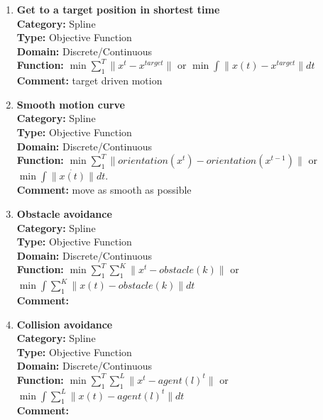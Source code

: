 \documentclass[12pt]{article}
\begin{document}
\begin{enumerate}
\item \textbf{Get to a target position in shortest time} \\
\label{obj:pos_reach}
\textbf{Category:} Spline \\
\textbf{Type:} Objective Function \\
\textbf{Domain:} Discrete/Continuous \\
\textbf{Function:} $ \min \sum_{1}^{T} \parallel x^{t} - x^{target} \parallel $ or $ \min \int \parallel x(t) - x^{target} \parallel dt  $ \\
\textbf{Comment:} target driven motion \\

\item \textbf{Smooth motion curve} \\
\label{obj:min_curve}
\textbf{Category:} Spline \\
\textbf{Type:} Objective Function \\
\textbf{Domain:} Discrete/Continuous \\
\textbf{Function:} $ \min \sum_{1}^{T} \parallel orientation(x^{t}) - orientation(x^{t-1}) \parallel $ or $ \min \int \parallel \dot{x(t)} \parallel dt $.\\
\textbf{Comment:} move as smooth as possible \\

\item \textbf{Obstacle avoidance} \\
\label{obj:obs_avd}
\textbf{Category:} Spline \\
\textbf{Type:} Objective Function \\
\textbf{Domain:} Discrete/Continuous \\
\textbf{Function:} $ \min \sum_{1}^{T} \sum_{1}^{K} \parallel x^{t} - obstacle(k) \parallel $ or $ \min \int \sum_{1}^{K} \parallel x(t) - obstacle(k) \parallel dt $ \\
\textbf{Comment:} \\

\item \textbf{Collision avoidance} \\
\label{obj:col_avd}
\textbf{Category:} Spline \\
\textbf{Type:} Objective Function \\
\textbf{Domain:} Discrete/Continuous \\
\textbf{Function:} $ \min \sum_{1}^{T} \sum_{1}^{L} \parallel x^{t} - agent(l)^{t} \parallel $ or $ \min \int \sum_{1}^{L} \parallel x(t) - agent(l)^{t} \parallel dt $ \\
\textbf{Comment:} \\


\end{enumerate}
\end{document}
